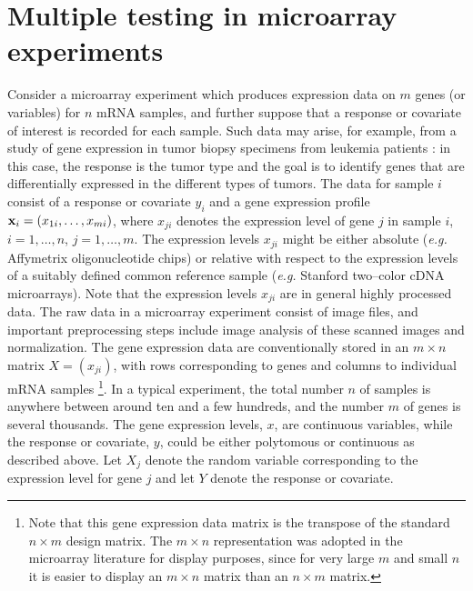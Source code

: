 \documentclass[11pt]{article}
\begin{document}
\section{Multiple testing in microarray experiments}

Consider a microarray experiment which produces expression data on $m$
genes (or variables) for $n$ mRNA samples, and further suppose that a response or covariate of interest is recorded for each sample. Such data may arise, for example, from a study of gene expression in tumor biopsy specimens from leukemia patients \citep{Golubetal}: in this case, the response is the tumor type and the goal is to identify genes that are differentially expressed in the different types of tumors. The data for sample $i$ consist of a response or covariate $y_i$ and a gene expression profile ${\bf x}_i = (x_{1i}, \ldots, x_{mi})$, where $x_{ji}$ denotes the expression level of gene $j$ in sample $i$, $i=1, \ldots, n$, $j=1, \ldots, m$. The expression levels $x_{ji}$ might be either absolute ({\it e.g.} Affymetrix oligonucleotide chips) or relative with
respect to the expression levels of a suitably defined common reference sample
({\it e.g.} Stanford two--color cDNA microarrays). Note that the expression levels $x_{ji}$ are in general highly processed data. The raw data in a microarray experiment consist of image files, and important preprocessing steps include image analysis of these scanned images and normalization. The gene expression data are conventionally stored in an $m \times n$ matrix $X = (x_{ji})$, with rows corresponding to genes and columns to individual mRNA samples \footnote{Note that this gene expression data matrix is the transpose of the standard $n \times m$ design matrix. The $m \times n$ representation was adopted in the microarray literature for display purposes, since for very large $m$ and small $n$ it is easier to display an $m \times n$ matrix than an $n \times m$ matrix.}. In a typical experiment, the total number $n$ of samples is anywhere between around ten and a few hundreds, and the number $m$ of genes is several thousands. The gene expression levels, $x$, are continuous variables, while the response or covariate, $y$, could be either polytomous or continuous as described above. Let $X_j$ denote the random variable corresponding to the expression level for gene $j$ and let $Y$ denote the response or covariate.  \\
\end{document}
